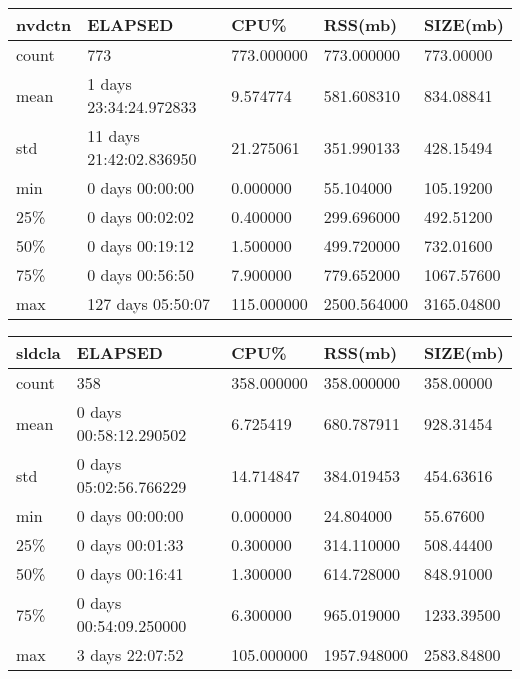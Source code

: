 \documentclass{article}
\begin{document}
\begin{table}[H]
\begin{tabular}{|l|l|l|l|l|}
\hline nvdctn&    ELAPSED&   CPU\%&  RSS(mb)&   SIZE(mb) \\
\hline count&   773& 773.000000&  773.000000&  773.00000 \\
\hline mean&  1 days 23:34:24.972833&  9.574774&  581.608310&  834.08841 \\
\hline std&  11 days 21:42:02.836950&  21.275061&  351.990133&  428.15494 \\
\hline min&   0 days 00:00:00&  0.000000&  55.104000&  105.19200 \\
\hline 25\%&   0 days 00:02:02&  0.400000&  299.696000&  492.51200 \\
\hline 50\%&   0 days 00:19:12&  1.500000&  499.720000&  732.01600 \\
\hline 75\%&   0 days 00:56:50&  7.900000&  779.652000& 1067.57600 \\
\hline max&  127 days 05:50:07& 115.000000& 2500.564000& 3165.04800 \\
\hline 
\end{tabular}
\label{TABLE-SessionSizenvdctn}
\end{table}

\begin{table}[H]
\begin{tabular}{|l|l|l|l|l|}
\hline sldcla& ELAPSED&   CPU\%&  RSS(mb)&   SIZE(mb) \\
\hline count&    358& 358.000000&  358.000000&  358.00000 \\
\hline mean&  0 days 00:58:12.290502&  6.725419&  680.787911&  928.31454 \\
\hline std&  0 days 05:02:56.766229&  14.714847&  384.019453&  454.63616 \\
\hline min&   0 days 00:00:00&  0.000000&  24.804000&  55.67600 \\
\hline 25\%&   0 days 00:01:33&  0.300000&  314.110000&  508.44400 \\
\hline 50\%&   0 days 00:16:41&  1.300000&  614.728000&  848.91000 \\
\hline 75\%&  0 days 00:54:09.250000&  6.300000&  965.019000& 1233.39500 \\
\hline max&   3 days 22:07:52& 105.000000& 1957.948000& 2583.84800 \\
\hline 
\end{tabular}
\label{TABLE-SessionSizesldcla}
\end{table}
\end{document}
